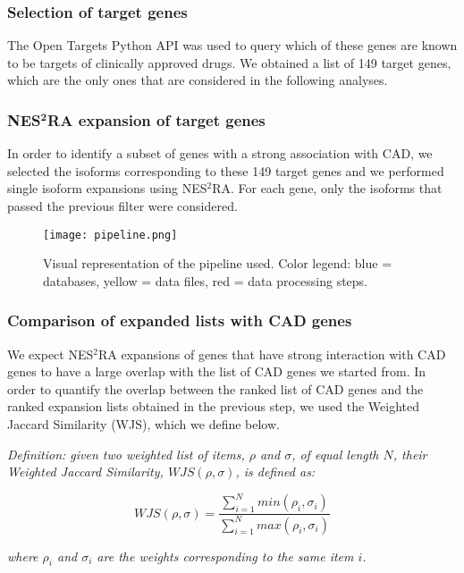 \documentclass[fleqn,10pt]{SelfArx} %
\begin{document}
\subsubsection*{Selection of target genes}

The Open Targets Python API \cite{open} was used to query which of these genes are known to be targets of clinically approved drugs. We obtained a list of 149 target genes, which are the only ones that are considered in the following analyses.

\subsubsection*{NES$^{\textbf{2}}$RA expansion of target genes}

In order to identify a subset of genes with a strong association with CAD, we selected the isoforms corresponding to these 149 target genes and we performed single isoform expansions using NES$^2$RA. For each gene, only the isoforms that passed the previous filter were considered.

\begin{figure}
	\texttt{[image: pipeline.png]}
	\caption{Visual representation of the pipeline used. Color legend: blue = databases, yellow = data files, red = data processing steps.}
	\label{Fig:pipe}
\end{figure}

\subsubsection*{Comparison of expanded lists with CAD genes}

We expect NES$^2$RA expansions of genes that have strong interaction with CAD genes to have a large overlap with the list of CAD genes we started from. In order to quantify the overlap between the ranked list of CAD genes and the ranked expansion lists obtained in the previous step, we used the Weighted Jaccard Similarity (WJS), which we define below.\medskip

\noindent
\textit{Definition: given two weighted list of items, $\rho$ and $\sigma$, of equal length $N$, their Weighted Jaccard Similarity, $WJS(\rho, \sigma)$, is defined as:}

$$
WJS(\rho, \sigma) = \dfrac{\sum_{i=1}^Nmin(\rho_i,\sigma_i)}{\sum_{i=1}^Nmax(\rho_i,\sigma_i)}
$$

\noindent
\textit{where $\rho_i$ and $\sigma_i$ are the weights corresponding to the same item $i$.}\medskip
\end{document}
